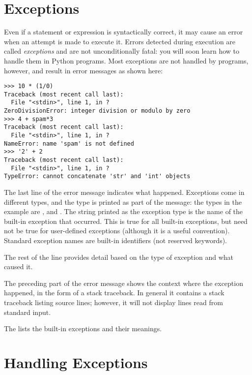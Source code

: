 \documentclass{manual}
\begin{document}
\section{Exceptions \label{exceptions}}

Even if a statement or expression is syntactically correct, it may
cause an error when an attempt is made to execute it.
Errors detected during execution are called \emph{exceptions} and are
not unconditionally fatal: you will soon learn how to handle them in
Python programs.  Most exceptions are not handled by programs,
however, and result in error messages as shown here:

\begin{verbatim}
>>> 10 * (1/0)
Traceback (most recent call last):
  File "<stdin>", line 1, in ?
ZeroDivisionError: integer division or modulo by zero
>>> 4 + spam*3
Traceback (most recent call last):
  File "<stdin>", line 1, in ?
NameError: name 'spam' is not defined
>>> '2' + 2
Traceback (most recent call last):
  File "<stdin>", line 1, in ?
TypeError: cannot concatenate 'str' and 'int' objects
\end{verbatim}

The last line of the error message indicates what happened.
Exceptions come in different types, and the type is printed as part of
the message: the types in the example are
,  and
.
The string printed as the exception type is the name of the built-in
exception that occurred.  This is true for all built-in
exceptions, but need not be true for user-defined exceptions (although
it is a useful convention).
Standard exception names are built-in identifiers (not reserved
keywords).

The rest of the line provides detail based on the type of exception
and what caused it.

The preceding part of the error message shows the context where the
exception happened, in the form of a stack traceback.
In general it contains a stack traceback listing source lines; however,
it will not display lines read from standard input.

The  lists the built-in exceptions and their meanings.


\section{Handling Exceptions \label{handling}}
\end{document}
